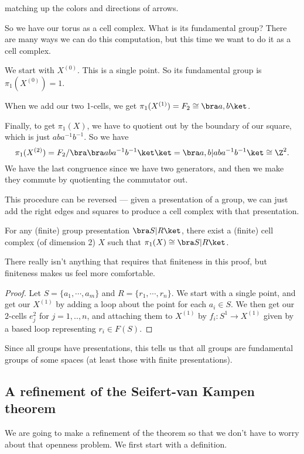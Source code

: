 \documentclass[a4paper]{article}
\begin{document}
\begin{eg}
\begin{center}
  \end{center}
  matching up the colors and directions of arrows.

  So we have our torus as a cell complex. What is its fundamental group? There are many ways we can do this computation, but this time we want to do it as a cell complex.

  We start with $X^{(0)}$. This is a single point. So its fundamental group is $\pi_1(X^{(0)}) = 1$.

  When we add our two 1-cells, we get $\pi_1(X^{(1)}) = F_2 \cong \bra a, b\ket$.

  Finally, to get $\pi_1(X)$, we have to quotient out by the boundary of our square, which is just $aba^{-1}b^{-1}$. So we have
  \[
    \pi_1(X^{(2)}) = F_2/\bra \bra aba^{-1}b^{-1}\ket\ket = \bra a, b | aba^{-1}b^{-1}\ket \cong \Z^2.
  \]
  We have the last congruence since we have two generators, and then we make they commute by quotienting the commutator out.
\end{eg}
This procedure can be reversed --- given a presentation of a group, we can just add the right edges and squares to produce a cell complex with that presentation.

\begin{cor}
  For any (finite) group presentation $\bra S|R\ket$, there exist a (finite) cell complex (of dimension 2) $X$ such that $\pi_1(X) \cong \bra S|R \ket$.
\end{cor}
There really isn't anything that requires that finiteness in this proof, but finiteness makes us feel more comfortable.

\begin{proof}
  Let $S = \{a_1, \cdots, a_m\}$ and $R = \{r_1, \cdots, r_n\}$. We start with a single point, and get our $X^{(1)}$ by adding a loop about the point for each $a_i \in S$. We then get our $2$-cells $e_j^2$ for $j = 1, .., n$, and attaching them to $X^{(1)}$ by $f_i: S^1 \to X^{(1)}$ given by a based loop representing $r_i \in F(S)$.
\end{proof}
Since all groups have presentations, this tells us that all groups are fundamental groups of some spaces (at least those with finite presentations).

\subsection{A refinement of the Seifert-van Kampen theorem}
We are going to make a refinement of the theorem so that we don't have to worry about that openness problem. We first start with a definition.
\end{document}
